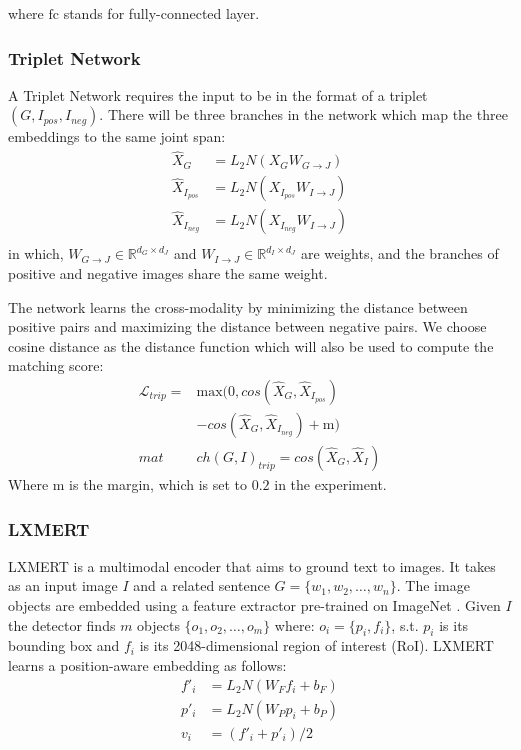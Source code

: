 \documentclass[11pt]{article}
\begin{document}
where $\mathrm{fc}$ stands for fully-connected layer.

\subsubsection{Triplet Network}
A Triplet Network requires the input to be in the format of a triplet $(G, I_{pos}, I_{neg})$. There will be three branches in the network which map the three embeddings to the same joint span:
\begin{equation}
    \begin{split}
         \hat{X}_G &= L_2N(X_G W_{G \rightarrow J}) \\
         \hat{X}_{I_{pos}} &= L_2N(X_{I_{pos}} W_{I \rightarrow J}) \\
         \hat{X}_{I_{neg}} &= L_2N(X_{I_{neg}} W_{I \rightarrow J}) \\
    \end{split}
\end{equation}
in which, $W_{G \rightarrow J} \in \mathbb{R}^{d_G \times d_J}$ and $W_{I \rightarrow J} \in \mathbb{R}^{d_I \times d_J}$ are weights, and the branches of positive and negative images share the same weight.

The network learns the cross-modality by minimizing the distance between positive pairs and maximizing the distance between negative pairs. We choose cosine distance as the distance function which will also be used to compute the matching score:
\begin{equation}
    \begin{split}
        \mathcal{L}_{trip} = &\mathrm{max} (0, cos(\hat{X}_G, \hat{X}_{I_{pos}}) \\
        &- cos(\hat{X}_G, \hat{X}_{I_{neg}}) + \mathrm{m}) \\
        mat&ch(G, I)_{trip} = cos(\hat{X}_G, \hat{X}_I)
    \end{split}
\end{equation}
Where m is the margin, which is set to $0.2$ in the experiment.

\subsubsection{LXMERT}
LXMERT \cite{tan2019lxmert} is a multimodal encoder that aims to ground text to images. It takes as an input image $I$ and a related sentence $G = \{w_1, w_2, \ldots, w_n\}$. The image objects are embedded using a feature extractor \cite{Anderson2017up-down} pre-trained on ImageNet \cite{deng2009imagenet}. Given $I$ the detector finds $m$ objects $\{o_1, o_2, \ldots, o_m\}$ where: $o_i = \{p_i, f_i\}$, s.t. $p_i$ is its bounding box and $f_i$ is its 2048-dimensional region of interest (RoI). LXMERT learns a position-aware embedding as follows:  
\begin{align}
    f'_i &= L_2N(W_Ff_i + b_F) \\
    p'_i &= L_2N(W_Pp_i + b_P) \\
    v_i &= ( f'_i+ p'_i)/ 2
\end{align}
\end{document}
